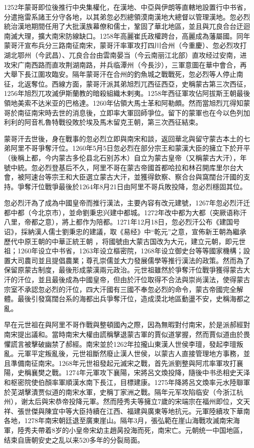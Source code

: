1252年蒙哥即位後推行中央集權化，在漢地、中亞與伊朗等直轄地設置行中书省，分遣拖雷系諸王分守各地，以其弟忽必烈總領漠南漢地大總督以管理漢地。忽必烈統治漢地期間任用了大批漢族幕僚和儒士，鞏固了華北地區，並且與兀良合台迂迴南滅大理，擴大南宋防線缺口。1258年高麗崔氏政權跨台，高麗成為藩屬國。同年蒙哥汗宣布兵分三路南征南宋，蒙哥汗率軍攻打四川合州（今重慶）、忽必烈攻打湖北鄂州（今武昌）、兀良合台由雲南晏当（今云南丽江北部）直攻经过安南，进攻宋广南西路而直攻荆湖南路，并兵临潭州（今長沙），三軍意圖在華中會合，再大舉下長江圍攻臨安。隔年蒙哥汗在合州的釣魚城之戰戰死，忽必烈等人停止南征，北返奪位。西線方面，蒙哥汗派其弟旭烈兀西征西亞，史稱蒙古第三次西征，1256年旭烈兀攻滅伊斯蘭教的暗殺組織木剌夷。1258年西征軍攻佔阿拔斯王朝最後領地美索不达米亚的巴格達。1260年佔領大馬士革和阿勒頗。然而當旭烈兀得知蒙哥於南征南宋時去世的消息後，立即率大軍回師爭位。留下的蒙軍也在今以色列加利利的阿音札魯特戰役敗於埃及馬木留克王朝，第三次西征結束。

蒙哥汗去世後，身在戰事的忽必烈立即與南宋和談，返回華北與留守蒙古本土的七弟阿里不哥爭奪汗位。1260年5月5日忽必烈在部分宗王和蒙漢大臣的擁立下於开平（後稱上都，今内蒙古多伦县北石别苏木）自立为蒙古皇帝（又稱蒙古大汗），年號中統。忽必烈登基后不久，阿里不哥在蒙古帝國首都哈拉和林召開库里尔台大會，被阿速台等宗王和大臣選立蒙古大汗，並獲得欽察、察合台與窩闊台汗國的支持。爭奪汗位戰爭最後於1264年8月21日由阿里不哥兵敗投降，忽必烈穩固其位。

忽必烈汗為了成為中國皇帝而推行漢法，主要內容有改元建號，1267年忽必烈汗迁都中都（今北京市），並命劉秉忠兴建中都城。1272年改中都为大都（突厥语称汗八里，帝都之意），將上都作为陪都。1271年12月18日，忽必烈汗公布《建国号诏》，採納漢人儒士劉秉忠的建議，取《易经》中“乾元”之意，宣佈新王朝為繼承歷代中原王朝的中華正統王朝 ，将國號由大蒙古国改为大元，建立元朝，即元世祖；1260年设立中书省，1263年设立樞密院，1268年设立御史台等等國家機構；設置大司農司並且提倡農業；尊孔崇儒並大力發展儒學等推行漢法的政策。然而為了保留原蒙古制度，最後形成蒙漢兩元政治。元世祖雖然於爭奪汗位戰爭獲得蒙古大汗的汗位，並且最後成為中國皇帝，但由於汗位取得不合法與崇尚漢法，使得蒙古宗室不承認忽必烈的汗位，四大汗國有三國不奉忽必烈的命令，蒙古帝國完全解體。最後引發窩闊台系的海都出兵爭奪汗位，造成漠北地區動盪不安，史稱海都之亂。

早在元世祖在與阿里不哥作戰與整頓國內之際，因為無暇對付南宋，於是派郝經對南宋提出議和。當時南宋大權由謊稱擊退蒙古軍的賈似道掌握，然而賈似道由於畏懼謊言被擊破幽禁了郝經。南宋並於1262年拉攏山東漢人世侯李璮，發起李璮叛亂。元軍平定叛亂後，元世祖斷然廢止漢人世侯，以蒙古人直接管理地方事務，並且準備南征南宋。1268年元世祖發起元滅宋之戰，首先派劉整與阿朮率軍攻打襄陽，史稱襄樊之戰。1274年元軍攻下襄陽，宋將呂文煥投降，隨後中书丞相史天泽和枢密院使伯顏率軍順漢水南下長江，目標建康。1275年降將呂文煥率元水陸聯軍於芜湖擊潰贾似道的南宋水軍，史稱丁家洲之戰。隔年元军攻陷临安（今浙江杭州），谢太后與宋恭帝投降元軍。然而陸秀夫等擁立7歲的宋端宗在福州即位，文天祥、張世傑與陳宜中等大臣持續在江西、福建與廣東等地抗元。元軍陸續攻下華南各地，1278年南宋朝廷退至廣東崖山。隔年3月，張弘範在崖山海戰攻滅南宋海軍，陸秀夫帶着8岁的小皇帝宋幼主趙昺投海而死，南宋亡。元朝统一中国地區，结束自唐朝安史之乱以来520多年的分裂局面。

